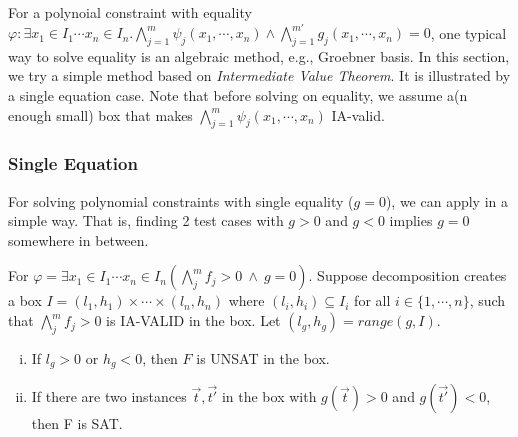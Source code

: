 \documentclass[runningheads,a4paper,oribibl]{llncs}
\begin{document}
For a polynoial constraint with equality 
$\varphi: \exists x_1 \in I_1 \cdots x_n \in I_n.
\bigwedge \limits_{j=1}^m \psi_j(x_1,\cdots,x_n) \wedge
\bigwedge \limits_{j=1}^{m'} g_j(x_1,\cdots,x_n) = 0$, 
one typical way to solve equality is an algebraic method, e.g., Groebner basis.
In this section, we try a simple method based on
{\em Intermediate Value Theorem}. It is illustrated by a single equation case.
Note that before solving on equality, we assume a(n enough small) box
that makes $\bigwedge \limits_{j=1}^m \psi_j(x_1,\cdots,x_n)$ IA-valid. 

\subsubsection{Single Equation}
For solving polynomial constraints with single equality ($g=0$),
we can apply in a simple way. 
That is, finding 2 test cases with $g > 0$ and $g < 0$ implies 
$g=0$ somewhere in between. 

\begin{lemma} \label{lemma:ivt}
For $\varphi = \exists x_1 \in I_1 \cdots x_n \in I_n
(\bigwedge \limits_{j}^m f_j > 0~\wedge~g = 0)$.
Suppose decomposition creates a box
$I = (l_1, h_1) \times \cdots \times (l_n, h_n)$
where $(l_i, h_i) \subseteq I_i$ for all $i \in \{1, \cdots, n\}$,
such that $\bigwedge \limits_{j}^m f_j > 0$ is IA-VALID in the box.
Let $(l_g, h_g) = range(g, I)$.
\begin{enumerate}[(i)]
\item If $l_g > 0$ or $h_g < 0$, then $F$ is UNSAT in the box. 
\item If there are two instances $\vec{t},\vec{t'}$ in the box
  with $g(\vec{t}) > 0$ and $g(\vec{t'}) < 0$, then F is SAT.
\end{enumerate}
\end{lemma}
\end{document}
